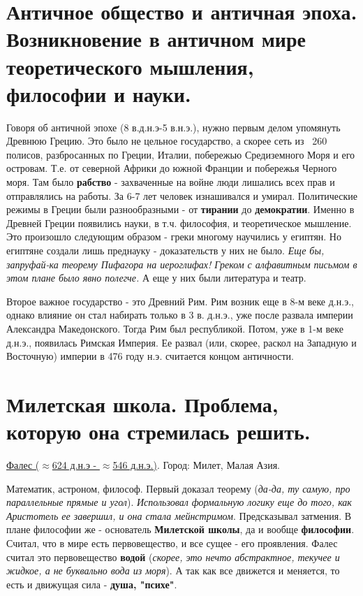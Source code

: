 \section{Античное общество и античная эпоха. Возникновение в античном мире теоретического мышления, философии и науки.}
Говоря об античной эпохе (8 в.д.н.э-5 в.н.э.), нужно первым делом упомянуть Древнюю Грецию. Это было не цельное государство, а скорее сеть из ~260 полисов, разбросанных по Греции, Италии, побережью Средиземного Моря и его островам. Т.е. от северной Африки до южной Франции и побережья Черного моря. Там было \textbf{рабство} - захваченные на войне люди лишались всех прав и отправлялись на работы. За 6-7 лет человек изнашивался и умирал.  Политические режимы в Греции были разнообразными - от \textbf{тирании} до \textbf{демократии}. Именно в Древней Греции появились науки, в т.ч. философия, и теоретическое мышление. Это произошло следующим образом - греки многому научились у египтян. Но египтяне создали лишь преднауку  - доказательств у них не было. \textit{Еще бы, запруфай-ка теорему Пифагора на иероглифах! Греком с алфавитным письмом  в этом плане было явно полегче.} А еще у них были литература и театр.

Второе важное государство - это Древний Рим. Рим возник еще в 8-м веке д.н.э., однако влияние он стал набирать только в 3 в. д.н.э., уже после развала империи Александра Македонского. Тогда Рим был республикой. Потом, уже в 1-м веке д.н.э., появилась Римская Империя. Ее развал (или, скорее, раскол на Западную и Восточную) империи в 476 году н.э. считается концом античности.

\section{Милетская школа. Проблема, которую она стремилась решить.}
\underline{Фалес ($\approx$624 д.н.э - $\approx$546 д.н.э.)}. Город: Милет, Малая Азия.

Математик, астроном, философ. Первый доказал теорему (\textit{да-да, ту самую, про параллельные прямые и угол}). \textit{Использовал формальную логику еще до того, как Аристотель ее завершил, и она стала мейнстримом}. Предсказывал затмения. В плане философии же - основатель \textbf{Милетской школы}, да и вообще \textbf{философии}. Считал, что в мире есть первовещество, и все сущее - его проявления. Фалес считал это первовещество \textbf{водой} (\textit{скорее, это нечто абстрактное, текучее и жидкое, а не буквально вода из моря}). А так как все движется и меняется, то есть и движущая сила - \textbf{душа, "психе"}.

